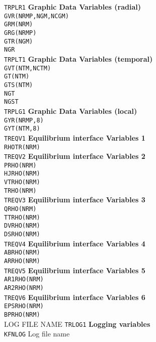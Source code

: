 \documentclass[11pt]{jarticle}
\newcommand{\commonBlock}[2]
{\texttt{#1} \> \> \> \textbf{#2} \\}
\newcommand{\commonVar}[3]
{\> \texttt{#1} \> [#2] \> #3 \\}
\begin{document}
\begin{tabbing}
\commonBlock{TRPLR1}{Graphic Data Variables (radial)}
\commonVar{GVR(NRMP,NGM,NCGM)}{S}{}
\commonVar{GRM(NRM)}{S}{}
\commonVar{GRG(NRMP)}{S}{}
\commonVar{GTR(NGM)}{S}{}
\commonVar{NGR}{I}{}

\commonBlock{TRPLT1}{Graphic Data Variables (temporal)}
\commonVar{GVT(NTM,NCTM)}{S}{}
\commonVar{GT(NTM)}{S}{}
\commonVar{GTS(NTM)}{S}{}
\commonVar{NGT}{I}{}
\commonVar{NGST}{I}{}

\commonBlock{TRPLG1}{Graphic Data Variables (local)}
\commonVar{GYR(NRMP,8)}{S}{}
\commonVar{GYT(NTM,8)}{S}{}

\commonBlock{TREQV1}{Equilibrium interface Variables 1}
\commonVar{RHOTR(NRM)}{D}{}

\commonBlock{TREQV2}{Equilibrium interface Variables 2}
\commonVar{PRHO(NRM)}{D}{}
\commonVar{HJRHO(NRM)}{D}{}
\commonVar{VTRHO(NRM)}{D}{}
\commonVar{TRHO(NRM)}{D}{}

\commonBlock{TREQV3}{Equilibrium interface Variables 3}
\commonVar{QRHO(NRM)}{D}{}
\commonVar{TTRHO(NRM)}{D}{}
\commonVar{DVRHO(NRM)}{D}{}
\commonVar{DSRHO(NRM)}{D}{}

\commonBlock{TREQV4}{Equilibrium interface Variables 4}
\commonVar{ABRHO(NRM)}{D}{}
\commonVar{ARRHO(NRM)}{D}{}

\commonBlock{TREQV5}{Equilibrium interface Variables 5}
\commonVar{AR1RHO(NRM)}{D}{}
\commonVar{AR2RHO(NRM)}{D}{}

\commonBlock{TREQV6}{Equilibrium interface Variables 6}
\commonVar{EPSRHO(NRM)}{D}{}
\commonVar{BPRHO(NRM)}{D}{}

LOG FILE NAME
\commonBlock{TRLOG1}{Logging variables}
\commonVar{KFNLOG}{K}{Log file name}

\end{tabbing}
\end{document}
